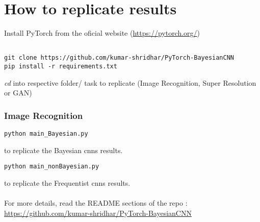 
\chapter{How to replicate results}

Install PyTorch from the oficial website (\url{https://pytorch.org/})

\begin{verbatim} 

git clone https://github.com/kumar-shridhar/PyTorch-BayesianCNN
pip install -r requirements.txt

\end{verbatim}
\textit{cd} into respective folder/ task to replicate (Image Recognition, Super Resolution or GAN)

\subsection{Image Recognition}

\begin{verbatim} 
python main_Bayesian.py
\end{verbatim}

to replicate the Bayesian \acp{cnn} results.

\begin{verbatim} 
python main_nonBayesian.py
\end{verbatim}

to replicate the Frequentist \acp{cnn} results.\\

\\For more details, read the README sections of the repo : \url{https://github.com/kumar-shridhar/PyTorch-BayesianCNN}


